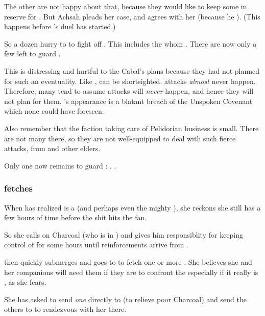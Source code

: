 The other \resphain are not happy about that, because they would like to keep some in reserve for \Ishnaruchaefir.
But Achsah pleads her case, and \Teshrial agrees with her (because he ).
(This happens before \Teshrial's duel has started.)

So a dozen \resphain hurry to \Forclin to fight off \Nzessuacrith. 
This includes the \resphain{} whom \Teshrial{} . 
There are now only a few left to guard \Malcur. 

This is distressing and hurtful to the Cabal's plans because they had not planned for such an eventuality. 
Like \humans, \resphain can be shortsighted.
\Dragon attacks \emph{almost} never happen.
Therefore, many \resphain tend to assume \dragon attacks will \emph{never} happen, and hence they will not plan for them. 
\Nzessuacrith's appearance is a blatant breach of the Unspoken Covenant which none could have foreseen.

Also remember that the faction taking care of Pelidorian business is small. 
There are not many \resphain there, so they are not well-equipped to deal with such fierce \dragon attacks, from \shaeeroth and other elders.

Only one \resphan{} now remains to guard \Malcur: \Paerzim. 
. 





\subsubsection{\Achsah fetches \umbrae}
When \Achsah{} has realized \Takestsha{} is a \dragon{} (and perhaps even the mighty \Nzessuacrith), she reckons she still has a few hours of time before the shit hits the fan. 

So she calls on Charcoal (who is in \Forclin) and gives him responsiblity for keeping control of \Forclin{} for some hours until reinforcements arrive from \Malcur. 

\Achsah{} then quickly submerges and goes to \Nyx{} to fetch one or more \umbrae. 
She believes she and her companions will need them if they are to confront the \dragon\dash especially if it really is \Nzessuacrith, as she fears. 

She has asked \Teshrial{} to send \emph{one} \resphan{} directly to \Forclin{} (to relieve poor Charcoal) and send the others to \Nyx{} to rendezvous with her there. 

